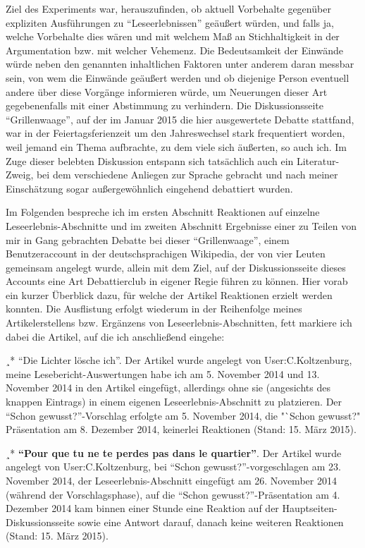 \documentclass[fontsize=12pt]{scrartcl}
\begin{document}
Ziel des Experiments war, he\-rauszufinden, ob aktuell Vorbehalte gegen\"uber expliziten Ausf\"uh\-rungen zu "`Leseerlebnissen"' ge\"au{\ss}ert w\"urden, und falls ja, welche Vorbehalte dies w\"aren und mit welchem Ma{\ss} an Stichhaltigkeit in der Argumentation bzw. mit welcher Vehemenz. Die Bedeutsamkeit der Einw\"ande w\"urde neben den genannten inhaltlichen Faktoren unter anderem daran messbar sein, von wem die Einw\"ande ge\"au{\ss}ert werden und ob diejenige Person eventuell andere \"uber diese Vorg\"ange informieren w\"urde, um Neuerungen dieser Art gegebenenfalls mit einer Abstimmung zu verhindern. Die Dis\-kus\-si\-onsseite "`Grillenwaage"', auf der im Januar 2015 die \mbox{hier} ausgewertete Debatte stattfand, war in der Feiertagsferienzeit um den Jahreswechsel stark frequentiert worden, weil jemand ein Thema aufbrachte, zu dem viele sich \"au{\ss}erten, so auch ich. Im Zuge dieser belebten Dis\-kus\-si\-on entspann sich tats\"achlich auch ein Li\-te\-ra\-tur-Zweig, bei dem verschiedene Anliegen zur Sprache gebracht und nach meiner Einsch\"atzung sogar au{\ss}ergew\"ohnlich eingehend debattiert wurden.

Im Folgenden bespreche ich im ersten Abschnitt Reaktionen auf einzelne Lese\-erleb\-nis-Abschnitte und im zwei\-ten Abschnitt Ergebnisse einer zu Teilen von mir in Gang gebrachten Debatte bei dieser "`Grillenwaage"', einem Be\-nut\-zeraccount in der deutsch\-spra\-chi\-gen Wi\-ki\-pe\-dia, der von \mbox{vier} Leuten gemeinsam angelegt wurde, allein mit dem Ziel, auf der Dis\-kus\-si\-onsseite dieses Accounts eine Art Debattierclub in eigener Regie f\"uhren zu k\"onnen. \mbox{Hier} vorab ein kurzer \"Uberblick dazu, f\"ur welche der Artikel Reaktionen erzielt werden konnten. Die Ausflistung erfolgt wiederum in der Reihenfolge meines Artikelerstellens bzw. Erg\"anzens von Leseerlebnis-Abschnitten, fett markiere ich dabei die Artikel, auf die ich anschlie{\ss}end eingehe: 

¸* "`Die Lichter l\"osche ich"'. Der Artikel wurde angelegt von \mbox{User}:C.Kolt\-zen\-burg, meine Lesebericht-Auswertungen habe ich am 5. November 2014 und 13. November 2014 in den Artikel eingef\"ugt, al\-ler\-dings ohne sie (angesichts des knappen Eintrags) in einem eigenen Leseerlebnis-Abschnitt zu platzieren. Der "`Schon gewusst?"'-Vorschlag erfolgte am 5. November 2014, die "`Schon gewusst?" Pr\"asentation am 8. Dezember 2014, keinerlei Reaktionen (Stand: 15. M\"arz 2015).

¸* \textbf{"`Pour que tu ne te perdes pas dans le quartier"'}. Der Artikel wurde angelegt von \mbox{User}:C.Kolt\-zen\-burg, bei "`Schon gewusst?"'-vorgeschlagen am 23. November 2014, der Leseerlebnis-Abschnitt eingef\"ugt am 26. November 2014 (w\"ahrend der Vorschlagsphase), auf die "`Schon gewusst?"'-Pr\"asentation am 4. Dezember 2014 kam binnen einer Stunde eine Reaktion auf der Hauptsei\-ten-Dis\-kus\-si\-onsseite sowie eine Antwort darauf, danach keine weiteren Reaktionen (Stand: 15. M\"arz 2015).
\end{document}

